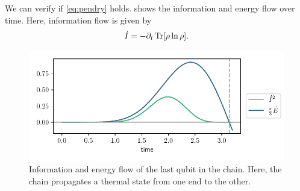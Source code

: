 \documentclass[a4paper,11pt]{scrartcl}
\begin{document}
We can verify if \cref{eq:pendry} holds.  shows the information and energy flow over time. Here, information flow
is given by
\begin{align}\label{eq:i-dot-sq}
    \dot{I} = -\partial_t \Tr[\rho\ln\rho].
\end{align}
\begin{figure}[H]
    \centering
    \includegraphics{pendry_propagate_thermal_state_energy_without_ln2_new.pdf}
    \caption{Information and energy flow of the last qubit in the chain. Here, the chain propagates a thermal state from one end to the other.}
    \label{fig:pendry-thermal}
\end{figure}
\end{document}
